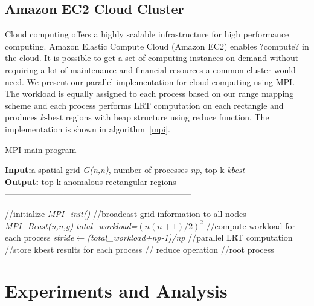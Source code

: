 \documentclass[AMA,LATO1COL]{WileyNJD-v2}
\begin{document}
\subsection{Amazon EC2 Cloud Cluster }
Cloud computing offers a highly scalable infrastructure for high performance computing. Amazon Elastic Compute Cloud (Amazon EC2) enables ?compute? in the cloud. It is possible to get a set of computing instances on demand without requiring a lot of maintenance and financial resources a common cluster would need. We present our parallel implementation for cloud computing using MPI. The workload is equally assigned to each process based on our range mapping scheme and each process performs LRT computation on each rectangle and produces $k$-best regions with heap structure using reduce function. The implementation is shown in algorithm~\ref{mpi}.

\begin{algorithm}[t!]
\label{al}
\caption{ MPI main program}\label{mpi}
\textbf{Input:}a spatial grid \textit{G(n,n)}, number of processes \textit{np}, top-k \textit{kbest} \\
\textbf{Output:} top-k anomalous rectangular regions\\
------------------------------------------------------------------ \\
\begin{algorithmic}[1]
\State //initialize
\State \textit {MPI\_init()}
\State //broadcast grid information to all nodes
\State \textit {MPI\_Bcast(n,n,g)}
\State \textit {total\_workload=$(n(n+1)/2)^2$}
\State //compute workload for each process
\State \textit{stride\(\leftarrow\)(total\_workload+np-1)/np}
\State //parallel LRT computation
\State //store kbest results for each process
\State // reduce operation
\State //root process
\EndIf
{}
\end{algorithmic}
\end{algorithm}

\section{Experiments and Analysis}\label{EA}
\end{document}
